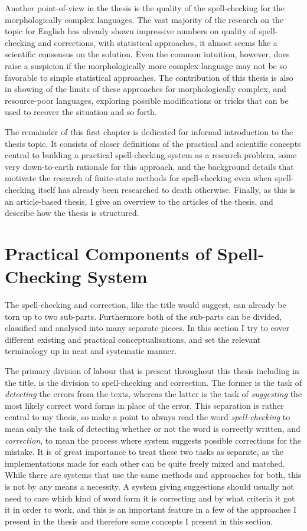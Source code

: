 \documentclass[officiallayout]{unihelcompling}
\begin{document}
Another point-of-view in the thesis is the quality of the spell-checking for
the morphologically complex languages. The vast majority of the research on the
topic for English has already shown impressive numbers on quality of
spell-checking and corrections, with statistical approaches, it almost seems
like a scientific consensus on the solution. Even the common intuition,
however, does raise a suspicion if the morphologically more complex language
may not be so favorable to simple statistical approaches. The contribution of
this thesis is also in showing of the limits of these approaches for
morphologically complex, and resource-poor languages, exploring possible
modifications or tricks that can be used to recover the situation and so forth.

The remainder of this first chapter is dedicated for informal introduction to
the thesis topic. It consists of closer definitions of the practical and
scientific concepts central to building a practical spell-checking system as a
research problem, some very down-to-earth rationale for this approach, and the
background details that motivate the research of finite-state methods for
spell-checking even when spell-checking itself has already been researched to
death otherwise. Finally, as this is an article-based thesis, I give an
overview to the articles of the thesis, and describe how the thesis is
structured.

\section{Practical Components of Spell-Checking System}
\label{sec:practical-components}

The spell-checking and correction, like the title would suggest, can already be
torn up to two sub-parts. Furthermore both of the sub-parts can be divided,
classified and analysed into many separate pieces. In this section I try to
cover different existing and practical conceptualisations, and set the relevant
terminology up in neat and systematic manner.

The primary division of labour that is present throughout this thesis including
in the title, is the division to spell-checking and correction. The former is
the task of \emph{detecting} the errors from the texts, whereas the latter is
the task of \emph{suggesting} the most likely correct word forms in place of
the error. This separation is rather central to my thesis, so make a point to
always read the word \emph{spell-checking} to mean only the task of detecting
whether or not the word is correctly written, and \emph{correction}, to mean
the process where system suggests possible corrections for the mistake.  It is
of great importance to treat these two tasks as separate, as the
implementations made for each other can be quite freely mixed and matched.
While there are systems that use the same methods and approaches for both, this
is not by any means a necessity. A system giving suggestions should usually not
need to care which kind of word form it is correcting and by what criteria it
got it in order to work, and this is an important feature in a few of the
approaches I present in the thesis and therefore some concepts I present in
this section.
\end{document}

